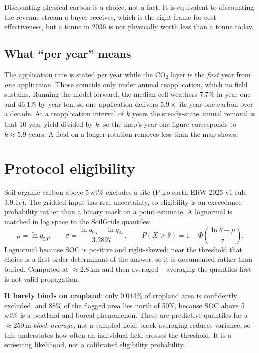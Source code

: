\documentclass[11pt,a4paper]{article}
\newcommand{\cotwo}{\ensuremath{\mathrm{CO_2}}}
\begin{document}
Discounting physical carbon is a choice, not a fact. It is equivalent to
discounting the revenue stream a buyer receives, which is the right frame for
cost-effectiveness, but a tonne in 2036 is not physically worth less than a tonne
today.

\subsection{What ``per year'' means}

The application rate is stated per year while the \cotwo{} layer is the
\emph{first} year from \emph{one} application. Those coincide only under annual
reapplication, which no field sustains. Running the model forward, the median cell
weathers 7.7\% in year one and 46.1\% by year ten, so
one application delivers $5.9\times$ its year-one carbon over a
decade. At a reapplication interval of $k$ years the steady-state annual removal
is that 10-year yield divided by $k$, so the map's year-one figure corresponds to
$k \approx 5.9$ years. A field on a longer rotation removes less than
the map shows.

\section{Protocol eligibility}

Soil organic carbon above 5\,wt\% excludes a site
(Puro.earth ERW 2025 v1 rule 3.9.1c). The gridded input has real uncertainty, so eligibility
is an exceedance probability rather than a binary mask on a point estimate. A
lognormal is matched in log space to the SoilGrids quantiles:
\begin{equation}
\mu = \ln q_{50}, \qquad
\sigma = \frac{\ln q_{95} - \ln q_{05}}{3.2897}, \qquad
P(X > \theta) = 1 - \Phi\!\left(\frac{\ln\theta - \mu}{\sigma}\right).
\end{equation}
Lognormal because SOC is positive and right-skewed; near the threshold that choice
is a first-order determinant of the answer, so it is documented rather than buried.
Computed at $\approx$2.8\,km and then averaged -- averaging the quantiles first is
not valid propagation.

\textbf{It barely binds on cropland}: only 0.044\% of cropland area is
confidently excluded, and 88\% of the flagged area lies north of
50\textdegree N, because
SOC above 5\,wt\% is a peatland and boreal phenomenon. These are predictive
quantiles for a $\approx$250\,m \emph{block average}, not a sampled field; block
averaging reduces variance, so this understates how often an individual field
crosses the threshold. It is a screening likelihood, not a calibrated eligibility
probability.
\end{document}
